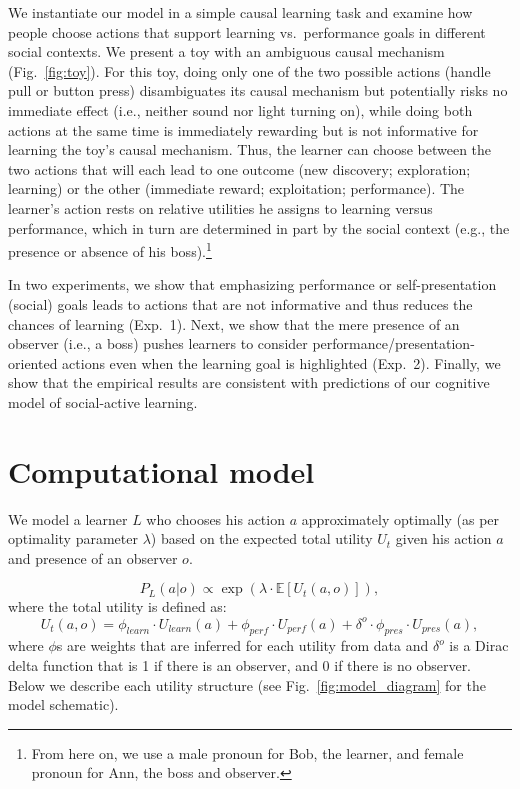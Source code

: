 \documentclass[10pt, letterpaper]{article}
\begin{document}
We instantiate our model in a simple causal learning task and examine
how people choose actions that support learning vs.~performance goals in
different social contexts. We present a toy with an ambiguous causal
mechanism (Fig.~\ref{fig:toy}). For this toy, doing only one of the two
possible actions (handle pull or button press) disambiguates its causal
mechanism but potentially risks no immediate effect (i.e., neither sound
nor light turning on), while doing both actions at the same time is
immediately rewarding but is not informative for learning the toy's
causal mechanism. Thus, the learner can choose between the two actions
that will each lead to one outcome (new discovery; exploration;
learning) or the other (immediate reward; exploitation; performance).
The learner's action rests on relative utilities he assigns to learning
versus performance, which in turn are determined in part by the social
context (e.g., the presence or absence of his
boss).\footnote{From here on, we use a male pronoun for Bob, the learner, and female pronoun for Ann, the boss and observer.}

In two experiments, we show that emphasizing performance or
self-presentation (social) goals leads to actions that are not
informative and thus reduces the chances of learning (Exp.~1). Next, we
show that the mere presence of an observer (i.e., a boss) pushes
learners to consider performance/presentation-oriented actions even when
the learning goal is highlighted (Exp.~2). Finally, we show that the
empirical results are consistent with predictions of our cognitive model
of social-active learning.

\section{Computational model}\label{computational-model}

We model a learner \(L\) who chooses his action \(a\) approximately
optimally (as per optimality parameter \(\lambda\)) based on the
expected total utility \(U_{t}\) given his action \(a\) and presence of
an observer \(o\).

\[ P_L(a | o) \propto \exp(\lambda \cdot \mathbb{E}[U_{t}(a,o)]),\]
\noindent
where the total utility is defined as:
\[U_{t}(a,o) = \phi_{learn} \cdot U_{learn}(a) + \phi_{perf} \cdot U_{perf}(a) + \delta^o \cdot \phi_{pres} \cdot U_{pres}(a),\]
\noindent
where \(\phi\)s are weights that are inferred for each utility from data
and \(\delta^o\) is a Dirac delta function that is 1 if there is an
observer, and 0 if there is no observer. Below we describe each utility
structure (see Fig.~\ref{fig:model_diagram} for the model schematic).
\end{document}
